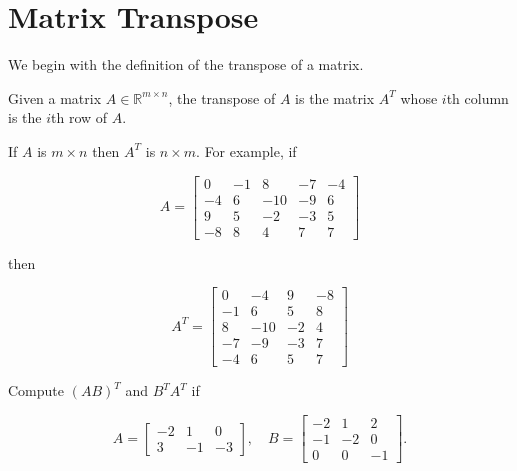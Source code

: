 \section{Matrix Transpose}
We begin with the definition of the transpose of a matrix.

\begin{definition}
    Given a matrix $A \in \mathbb{R}^{m \times n}$, the transpose of $A$ is the matrix $A^T$ whose $i$th column is the $i$th row of $A$.
\end{definition}

If $A$ is $m \times n$ then $A^T$ is $n \times m$. For example, if

\[
A=\left[\begin{array}{rrrrr}
0 & -1 & 8 & -7 & -4 \\
-4 & 6 & -10 & -9 & 6 \\
9 & 5 & -2 & -3 & 5 \\
-8 & 8 & 4 & 7 & 7
\end{array}\right]
\]

then

\[
A^T=\left[\begin{array}{rrrr}
0 & -4 & 9 & -8 \\
-1 & 6 & 5 & 8 \\
8 & -10 & -2 & 4 \\
-7 & -9 & -3 & 7 \\
-4 & 6 & 5 & 7
\end{array}\right]
\]

\begin{example} Compute $(AB)^T$ and $B^T A^T$ if

\[
A=\left[\begin{array}{rrr}
-2 & 1 & 0 \\
3 & -1 & -3
\end{array}\right], \quad B=\left[\begin{array}{rrr}
-2 & 1 & 2 \\
-1 & -2 & 0 \\
0 & 0 & -1
\end{array}\right].
\]
\end{example}

